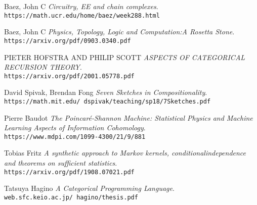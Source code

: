\documentclass{article}
\begin{document}

\begin{thebibliography}{9}
Baez, John C
\textit{Circuitry, EE and chain complexes}.
\\\texttt{https://math.ucr.edu/home/baez/week288.html}


Baez, John C
\textit{Physics, Topology, Logic and Computation:A Rosetta Stone}.
\\\texttt{https://arxiv.org/pdf/0903.0340.pdf}

PIETER HOFSTRA AND PHILIP SCOTT
\textit{ASPECTS OF CATEGORICAL RECURSION THEORY}.
\\\texttt{https://arxiv.org/pdf/2001.05778.pdf}

David Spivak, Brendan Fong
\textit{Seven Sketches in Compositionality}.
\\\texttt{https://math.mit.edu/~dspivak/teaching/sp18/7Sketches.pdf}

Pierre Baudot
\textit{The Poincaré-Shannon Machine: Statistical Physics and Machine Learning Aspects of Information Cohomology}.
\\\texttt{https://www.mdpi.com/1099-4300/21/9/881}


Tobias Fritz
\textit{A synthetic approach to Markov kernels, conditionalindependence and theorems on sufficient statistics}.
\\\texttt{https://arxiv.org/pdf/1908.07021.pdf}

Tatsuya Hagino
\textit{A Categorical Programming Language}.
\\\texttt{web.sfc.keio.ac.jp/~hagino/thesis.pdf}

\end{thebibliography}
\end{document}
